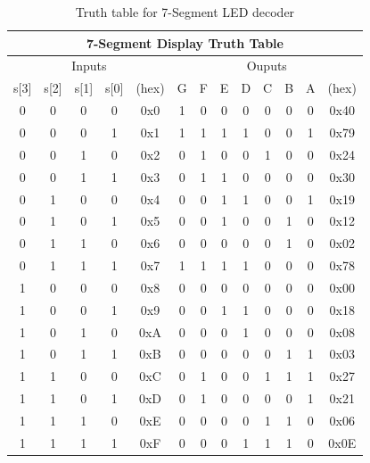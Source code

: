 \documentclass[11pt]{article}
\begin{document}
\begin{table}[h]
\centering
\begin{tabular}{|c|c|c|c|c|c|c|c|c|c|c|c|c|}
\hline
\multicolumn{13}{|c|}{7-Segment Display Truth Table}                                  \\ \hline
\multicolumn{5}{|c|}{Inputs}                      & \multicolumn{8}{c|}{Ouputs}       \\ \hline
s{[}3{]} & s{[}2{]} & s{[}1{]} & s{[}0{]} & (hex) & G & F & E & D & C & B & A & (hex) \\ \hline
0        & 0        & 0        & 0        & 0x0   & 1 & 0 & 0 & 0 & 0 & 0 & 0 & 0x40  \\ \hline
0        & 0        & 0        & 1        & 0x1   & 1 & 1 & 1 & 1 & 0 & 0 & 1 & 0x79  \\ \hline
0        & 0        & 1        & 0        & 0x2   & 0 & 1 & 0 & 0 & 1 & 0 & 0 & 0x24  \\ \hline
0        & 0        & 1        & 1        & 0x3   & 0 & 1 & 1 & 0 & 0 & 0 & 0 & 0x30  \\ \hline
0        & 1        & 0        & 0        & 0x4   & 0 & 0 & 1 & 1 & 0 & 0 & 1 & 0x19  \\ \hline
0        & 1        & 0        & 1        & 0x5   & 0 & 0 & 1 & 0 & 0 & 1 & 0 & 0x12  \\ \hline
0        & 1        & 1        & 0        & 0x6   & 0 & 0 & 0 & 0 & 0 & 1 & 0 & 0x02  \\ \hline
0        & 1        & 1        & 1        & 0x7   & 1 & 1 & 1 & 1 & 0 & 0 & 0 & 0x78  \\ \hline
1        & 0        & 0        & 0        & 0x8   & 0 & 0 & 0 & 0 & 0 & 0 & 0 & 0x00  \\ \hline
1        & 0        & 0        & 1        & 0x9   & 0 & 0 & 1 & 1 & 0 & 0 & 0 & 0x18  \\ \hline
1        & 0        & 1        & 0        & 0xA   & 0 & 0 & 0 & 1 & 0 & 0 & 0 & 0x08  \\ \hline
1        & 0        & 1        & 1        & 0xB   & 0 & 0 & 0 & 0 & 0 & 1 & 1 & 0x03  \\ \hline
1        & 1        & 0        & 0        & 0xC   & 0 & 1 & 0 & 0 & 1 & 1 & 1 & 0x27  \\ \hline
1        & 1        & 0        & 1        & 0xD   & 0 & 1 & 0 & 0 & 0 & 0 & 1 & 0x21  \\ \hline
1        & 1        & 1        & 0        & 0xE   & 0 & 0 & 0 & 0 & 1 & 1 & 0 & 0x06  \\ \hline
1        & 1        & 1        & 1        & 0xF   & 0 & 0 & 0 & 1 & 1 & 1 & 0 & 0x0E  \\ \hline
\end{tabular}
\caption{Truth table for 7-Segment LED decoder}
\label{table:7seg_decoder}
\end{table}
\end{document}
